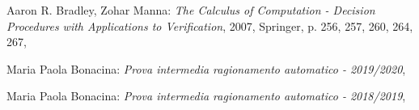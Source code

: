 
\begin{thebibliography}{9}

Aaron R. Bradley, Zohar Manna: \textit{The Calculus of Computation - Decision Procedures with Applications to Verification},
2007, Springer, p. 256, 257, 260, 264, 267,

Maria Paola Bonacina: \textit{Prova intermedia ragionamento automatico - 2019/2020},

Maria Paola Bonacina: \textit{Prova intermedia ragionamento automatico - 2018/2019},


\end{thebibliography}